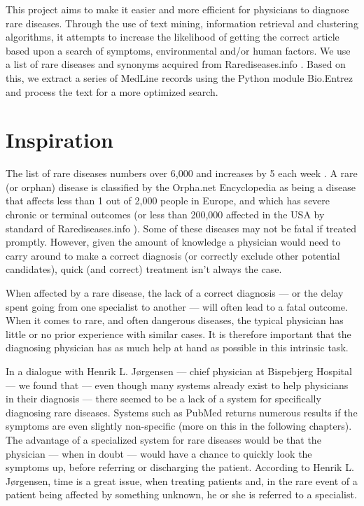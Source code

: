 This project aims to make it easier and more efficient for physicians
to diagnose rare diseases. Through the use of text mining,
information retrieval and clustering algorithms, it attempts to
increase the likelihood of getting the correct article based upon a
search of symptoms, environmental and/or human factors. We use a list
of rare diseases and synonyms acquired from Rarediseases.info
\cite{Rarediseases}. Based on this, we
extract a series of MedLine records \cite{PubMedFactSheetMedline}
using the Python module Bio.Entrez \cite{EntrezProgUtil} and process
the text for a more optimized search.

\section{Inspiration}

The list of rare diseases numbers over 6,000 and increases by 5 each
week \cite{AboutRareDiseasesOrphanet}. A rare (or orphan) disease is
classified by the Orpha.net Encyclopedia \cite{OrphanetEncyclopedia}
as being a disease that affects less than 1 out of 2,000 people in
Europe, and which has severe chronic or terminal outcomes (or less
than 200,000 affected in the USA by standard of Rarediseases.info
\cite{Rarediseases}). Some of these  diseases may not be fatal if treated promptly. However,
given the amount of knowledge a physician would need to carry
around to make a correct diagnosis (or correctly exclude other
potential candidates), quick (and correct) treatment isn't always the case.

When affected by a rare disease, the lack of a correct diagnosis
--- or the delay spent going from one specialist to another --- will
often lead to a fatal outcome. When it comes to rare, and often
dangerous diseases, the typical physician has little or no prior
experience with similar cases. It is therefore important that the
diagnosing physician has as much help at hand as possible in this
intrinsic task.

In a dialogue with Henrik L. J\o rgensen \cite{TheDude} --- chief
physician at Bispebjerg Hospital --- we found that --- even though
many systems already exist to help physicians in their diagnosis ---
there seemed to be a lack of a system for specifically diagnosing rare
diseases. Systems such as PubMed returns numerous results if the
symptoms are even slightly non-specific (more on this in the following
chapters). The advantage of a specialized system for rare diseases
would be that the physician --- when in doubt --- would have a chance
to quickly look the symptoms up, before referring or discharging the
patient. According to Henrik L. J\o rgensen, time is a great issue,
when treating patients and, in the rare event of a patient being
affected by something unknown, he or she is referred to a specialist.

